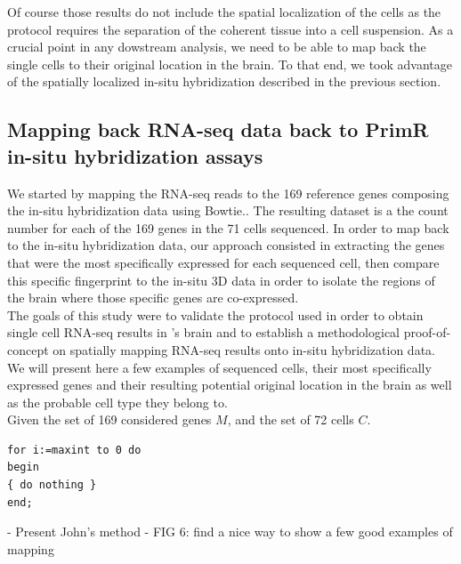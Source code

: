   	
	Of course those results do not include the spatial localization of the cells as the protocol requires the separation of the coherent tissue into a cell suspension. As a crucial point in any dowstream analysis, we need to be able to map back the single cells to their original location in the brain. To that end, we took advantage of the spatially localized in-situ hybridization described in the previous section.\\

  \subsection*{Mapping back RNA-seq data back to PrimR in-situ hybridization assays}
  	We started by mapping the RNA-seq reads to the 169 reference genes composing the in-situ hybridization data using Bowtie.. The resulting dataset is a the count number for each of the 169 genes in the 71 cells sequenced. In order to map back to the in-situ hybridization data, our approach consisted in extracting the genes that were the most specifically expressed for each sequenced cell, then compare this specific fingerprint to the in-situ 3D data in order to isolate the regions of the brain where those specific genes are co-expressed.\\
	
	The goals of this study were to validate the protocol used in order to obtain single cell RNA-seq results in \platy{}'s brain and to establish a methodological proof-of-concept on spatially mapping RNA-seq results onto in-situ hybridization data. We will present here a few examples of sequenced cells, their most specifically expressed genes and their resulting potential original location in the brain as well as the probable cell type they belong to.\\
	
	Given the set of 169 considered genes $M$, and the set of 72 cells $C$.
\begin{lstlisting}[float,caption=A floating example]
for i:=maxint to 0 do
begin
{ do nothing }
end;
\end{lstlisting}

    - Present John's method  
    - FIG 6: find a nice way to show a few good examples of mapping

